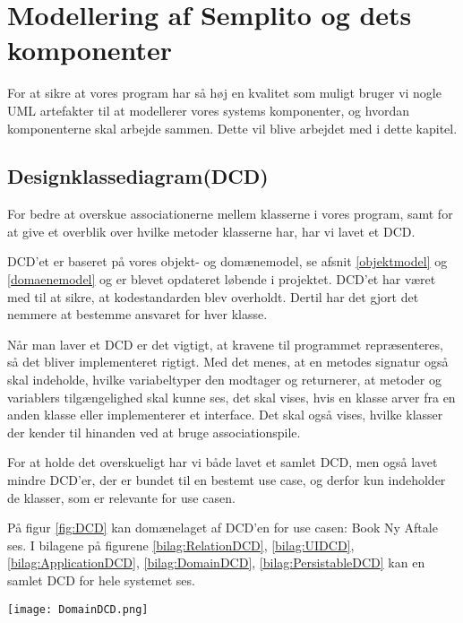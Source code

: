 \section{Modellering af Semplito og dets komponenter}
\label{kabitel:ModelleringSystem}

For at sikre at vores program har så høj en kvalitet som muligt bruger vi nogle UML artefakter til at modellerer vores systems komponenter, og hvordan komponenterne skal arbejde sammen.
Dette vil blive arbejdet med i dette kapitel.

\subsection{Designklassediagram(DCD)}
\label{DCD}

For bedre at overskue associationerne mellem klasserne i vores program, samt for at give et overblik over hvilke metoder klasserne har, har vi lavet et DCD. 

DCD'et er baseret på vores objekt- og domænemodel, se afsnit \ref{objektmodel} og \ref{domaenemodel} og er blevet opdateret løbende i projektet.
DCD'et har været med til at sikre, at kodestandarden blev overholdt.
Dertil har det gjort det nemmere at bestemme ansvaret for hver klasse.

Når man laver et DCD er det vigtigt, at kravene til programmet repræsenteres, så det bliver implementeret rigtigt.
Med det menes, at en metodes signatur også skal indeholde, hvilke variabeltyper den modtager og returnerer, at metoder og variablers tilgængelighed skal kunne ses, det skal vises, hvis en klasse arver fra en anden klasse eller implementerer et interface.
Det skal også vises, hvilke klasser der kender til hinanden ved at bruge associationspile.

For at holde det overskueligt har vi både lavet et samlet DCD, men også lavet mindre DCD'er, der er bundet til en bestemt use case, og derfor kun indeholder de klasser, som er relevante for use casen.

På figur \ref{fig:DCD} kan domænelaget af DCD'en for use casen: Book Ny Aftale ses.
I bilagene på figurene \ref{bilag:RelationDCD}, \ref{bilag:UIDCD}, \ref{bilag:ApplicationDCD}, \ref{bilag:DomainDCD}, \ref{bilag:PersistableDCD} kan en samlet DCD for hele systemet ses.


\begin{sidewaysfigure}
    \caption{DCD for Semplito - Bookingsystemet}
    \centering
        \texttt{[image: DomainDCD.png]}
    \label{fig:DCD}
\end{sidewaysfigure}

